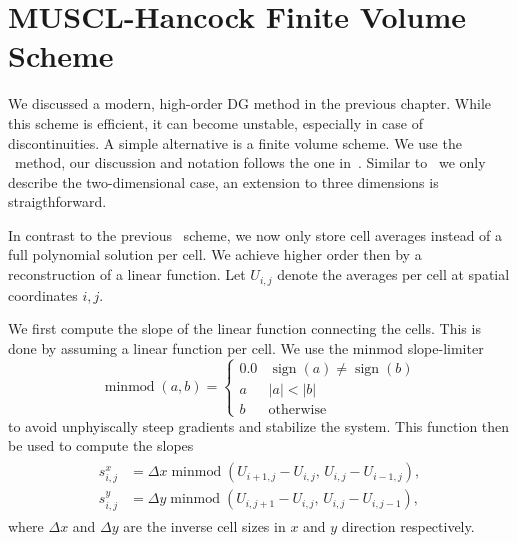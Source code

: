 \section{MUSCL-Hancock Finite Volume Scheme}\label{sec:muscl}
\newcommand{\cellAvg}[1][i,j]{U_{#1}}
\newcommand{\sign}{\operatorname{sign}}
\newcommand{\minmod}{\operatorname{minmod}}
\newcommand{\slope}[2][i,j]{s^{#2}_{#1}}
\newcommand{\gradCellAvg}[1][i,j]{\gradient{\cellAvg[#1]}}
\newcommand{\fluxX}{\flux_x}
\newcommand{\fluxY}{\flux_y}
We discussed a modern, high-order \textsc{DG} method in the previous chapter.
While this scheme is efficient, it can become unstable, especially in case of discontinuities.
A simple alternative is a finite volume scheme.
We use the \muscl\ method, our discussion and notation follows the one in~\cite{toro2013riemann}.
Similar to~\cite{toro2013riemann} we only describe the two-dimensional case, an extension to three dimensions is straigthforward.

In contrast to the previous \dg\ scheme, we now only store cell averages instead of a full polynomial solution per cell.
We achieve higher order then by a reconstruction of a linear function.
Let $\cellAvg$ denote the averages per cell at spatial coordinates $i,j$.

We first compute the slope of the linear function connecting the cells.
This is done by assuming a linear function per cell.
We use the minmod slope-limiter
\begin{equation}
  \label{eq:minmod}
  \operatorname{minmod}(a, b) =
  \begin{cases}
    0.0 & \sign(a) \neq \sign(b) \\
      a & \vert a \vert < \vert b \vert \\
      b & \text{otherwise}
  \end{cases}
\end{equation}
to avoid unphyiscally steep gradients and stabilize the system.
This function then be used to compute the slopes
\begin{align}\label{eq:slopes}
  \begin{split}
   \slope{x} &=  \Delta x \minmod \left( \cellAvg[i+1,j] - \cellAvg[i,j], \, \cellAvg[i,j] - \cellAvg[i-1, j] \right),\\ 
   \slope{y} &=  \Delta y \minmod \left( \cellAvg[i,j+1] - \cellAvg[i,j], \, \cellAvg[i,j] - \cellAvg[i, j-1] \right),
   \end{split}
\end{align}
where $\Delta x$ and $\Delta y$ are the inverse cell sizes in $x$ and $y$ direction respectively.

